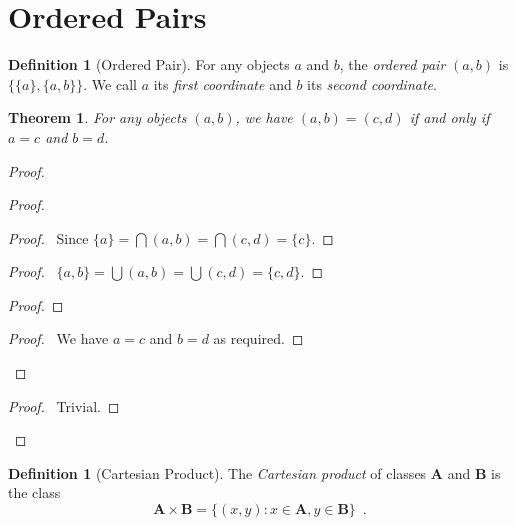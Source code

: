\documentclass{article}
\let\qed\relax
\newtheorem{theorem}[axiom]{Theorem}
\theoremstyle{definition}
\newtheorem{definition}[axiom]{Definition}
\begin{document}
    \section{Ordered Pairs}

    \begin{definition}[Ordered Pair]
        For any objects $a$ and $b$, the \emph{ordered pair} $(a,b)$ is $\{ \{ a \}, \{a, b \} \}$.
        We call $a$ its \emph{first coordinate} and $b$ its \emph{second coordinate}.
    \end{definition}

    \begin{theorem}
        For any objects $(a,b)$, we have $(a,b) = (c,d)$ if and only if $a = c$ and $b = d$.
    \end{theorem}

    \begin{proof}
        \pf
        \begin{proof}
            \begin{proof}
                \pf\ Since $\{a\} = \bigcap (a,b) = \bigcap (c,d) = \{c\}$.
            \end{proof}
            \begin{proof}
                \pf\ $\{a,b\} = \bigcup (a,b) = \bigcup (c,d) = \{c,d\}$.
            \end{proof}
            \begin{proof}
            \end{proof}
            \begin{proof}
                \pf\ We have $a = c$ and $b = d$ as required.
            \end{proof}
        \end{proof}
        \begin{proof}
            \pf\ Trivial.
        \end{proof}
        \qed
    \end{proof}

    \begin{definition}[Cartesian Product]
        The \emph{Cartesian product} of classes $\mathbf{A}$ and $\mathbf{B}$ is the class
        \[ \mathbf{A} \times \mathbf{B} = \{ (x,y) : x \in \mathbf{A}, y \in \mathbf{B} \} \enspace . \]
    \end{definition}
\end{document}
